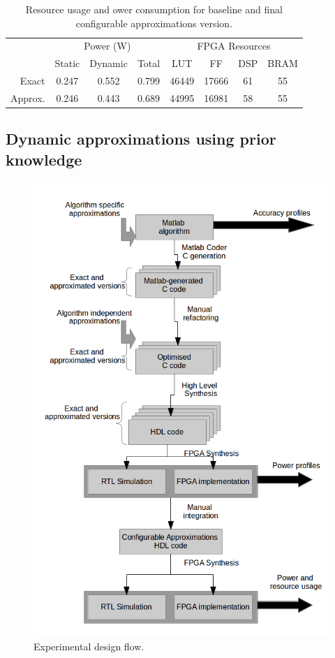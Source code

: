 \begin{table}[h]
\begin{tabular}{r c c c c c c c}
\toprule
 & \multicolumn{3}{c}{Power (W)} & \multicolumn{4}{c}{FPGA Resources}\\
 & Static & Dynamic & Total & LUT & FF & DSP & BRAM\\
\hline
Exact & 0.247 & 0.552 & 0.799 & 46449 & 17666 & 61 & 55\\
Approx. & 0.246 & 0.443 & 0.689 & 44995 & 16981 & 58 & 55\\
\hline
\end{tabular}
\caption{Resource usage and ower consumption for baseline and final configurable approximations version.}
\label{table:integrated}
\end{table}








\subsection{Dynamic approximations using prior knowledge}

\begin{figure}[tb]
  \centering
  \includegraphics[width=0.9\columnwidth]{img/experimental_flow.png}
  \caption{Experimental design flow.}
  \label{fig:experimental_flow}
\end{figure}
